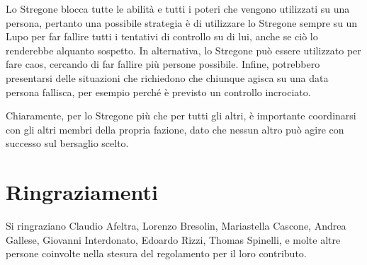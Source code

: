 \documentclass[a4paper,10pt]{article}
\begin{document}
\begin{itemize}
	Lo Stregone blocca tutte le abilità e tutti i poteri che vengono utilizzati su una persona, pertanto una possibile strategia è di utilizzare lo Stregone sempre su un Lupo per far fallire tutti i tentativi di controllo su di lui, anche se ciò lo renderebbe alquanto sospetto. In alternativa, lo Stregone può essere utilizzato per fare caos, cercando di far fallire più persone possibile. Infine, potrebbero presentarsi delle situazioni che richiedono che chiunque agisca su una data persona fallisca, per esempio perché è previsto un controllo incrociato.
	
	Chiaramente, per lo Stregone più che per tutti gli altri, è importante coordinarsi con gli altri membri della propria fazione, dato che nessun altro può agire con successo sul bersaglio scelto.
\end{itemize}
    
\section{Ringraziamenti}

Si ringraziano Claudio Afeltra, Lorenzo Bresolin, Mariastella Cascone, Andrea Gallese, Giovanni Interdonato, Edoardo Rizzi, Thomas Spinelli, e molte altre persone coinvolte nella stesura del regolamento per il loro contributo.
\end{document}
